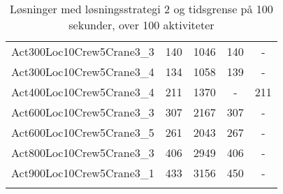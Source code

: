 \begin{center}
\begin{longtable}{ | l | c | c | c | c | }
Act300Loc10Crew5Crane3\_3	&	140	&	1046	&	140	&	-	\\
Act300Loc10Crew5Crane3\_4	&	134	&	1058	&	139	&	-	\\
Act400Loc10Crew5Crane3\_4	&	211	&	1370	&	-	&	211	\\
Act600Loc10Crew5Crane3\_3	&	307	&	2167	&	307	&	-	\\
Act600Loc10Crew5Crane3\_5	&	261	&	2043	&	267	&	-	\\
Act800Loc10Crew5Crane3\_3	&	406	&	2949	&	406	&	-	\\
Act900Loc10Crew5Crane3\_1	&	433	&	3156	&	450	&	-	\\
\hline							
\caption{Løsninger med løsningsstrategi 2 og tidsgrense på 100 sekunder, over 100 aktiviteter}			
\label{tab:solutionSSTFAARF100s}							
\end{longtable}				
\end{center}							